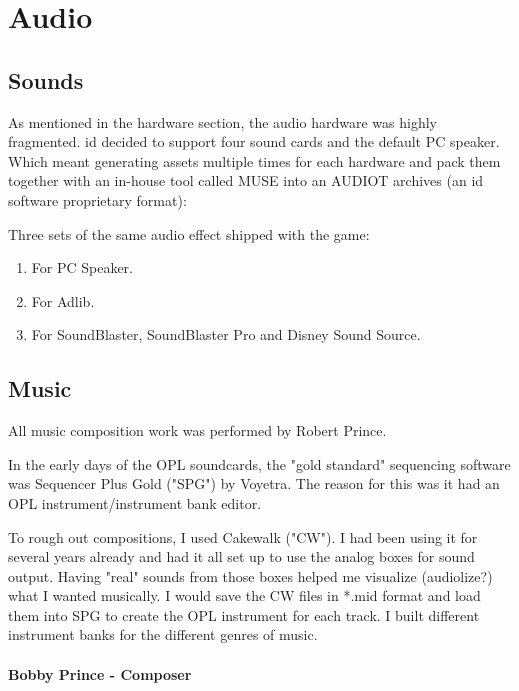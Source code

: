 \documentclass[book.tex]{subfiles}
\begin{document}
\section{Audio}

\subsection{Sounds}
As mentioned in the hardware section, the audio hardware was highly fragmented. id decided to support four sound cards and the default PC speaker. Which meant generating assets multiple times for each hardware and pack them together with an in-house tool called MUSE into an AUDIOT archives (an id software proprietary format):\\
\begin{figure}[H]
\centering
 \end{figure}
 \par
 Three sets of the same audio effect shipped with the game:
\begin{enumerate}
\item For PC Speaker.
\item For Adlib.
\item For SoundBlaster, SoundBlaster Pro and Disney Sound Source.
\end{enumerate}

\par
{}






\subsection{Music}
All music composition work was performed by Robert Prince.\\
\par
 \begin{fancyquotes}
In the early days of the OPL soundcards, the "gold standard" sequencing software was Sequencer Plus Gold ("SPG") by Voyetra. The reason for this was it had an OPL instrument/instrument bank editor.\\
\par
To rough out compositions, I used Cakewalk ("CW"). I had been using it for several years already and had it all set up to use the analog boxes for sound output. Having "real" sounds from those boxes helped me visualize (audiolize?) what I wanted musically. I would save the CW files in *.mid format and load them into SPG to create the OPL instrument for each track. I built different instrument banks for the different genres of music.\\
   \\
\textbf{Bobby Prince - Composer}
 \end{fancyquotes}\\
\end{document}
